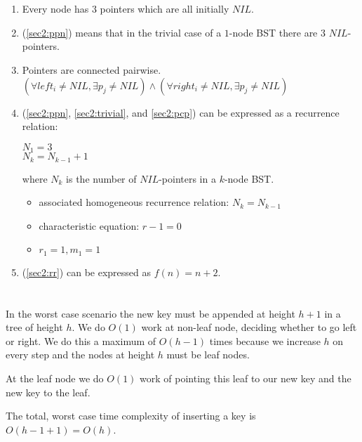 \documentclass[12pt, a4paper]{article}
\begin{document}
\section{} %
\begin{enumerate}
	\item Every node has $3$ pointers which are all initially $NIL$.
	\label{sec2:ppn}

	\item (\ref{sec2:ppn}) means that in the trivial case of a $1$-node BST there are $3$ $NIL$-pointers.
	\label{sec2:trivial}

	\item Pointers are connected pairwise. $(\forall left_i \neq NIL, \exists p_j \neq NIL) \land (\forall right_i \neq NIL, \exists p_j \neq NIL)$
	\label{sec2:pcp}

	\item (\ref{sec2:ppn}, \ref{sec2:trivial}, and \ref{sec2:pcp}) can be expressed as a recurrence relation:

	$N_1 = 3$\\
	$N_k = N_{k - 1} + 1$

	where $N_k$ is the number of $NIL$-pointers in a $k$-node BST.

	\begin{itemize}
		\item associated homogeneous recurrence relation: $N_k = N_{k - 1}$
		\item characteristic equation: $r - 1 = 0$
		\item $r_1 = 1, m_1 = 1$
	\end{itemize}
	\label{sec2:rr}

	\item (\ref{sec2:rr}) can be expressed as $f(n) = n + 2$.
\end{enumerate}

\section{} %
In the worst case scenario the new key must be appended at height $h+1$ in a tree of height $h$. We do $O(1)$ work at non-leaf node, deciding whether to go left or right. We do this a maximum of $O(h - 1)$ times because we increase $h$ on every step and the nodes at height $h$ must be leaf nodes.

At the leaf node we do $O(1)$ work of pointing this leaf to our new key and the new key to the leaf.

The total, worst case time complexity of inserting a key is $O(h - 1 + 1) = O(h)$.
\end{document}
